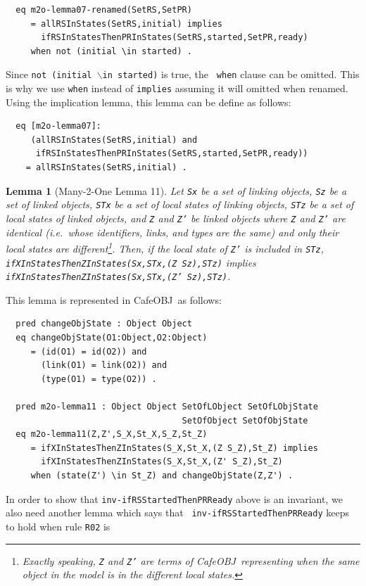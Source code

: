 \documentclass[12pt]{report}
\newtheorem{lemma}{Lemma}
\newcommand{\stt}[1]{{\small{\tt {#1}}}}
\newcommand{\cafeobj}{{\sf CafeOBJ}~}
\begin{document}
\begin{verbatim}
  eq m2o-lemma07-renamed(SetRS,SetPR)
     = allRSInStates(SetRS,initial) implies 
       ifRSInStatesThenPRInStates(SetRS,started,SetPR,ready)
     when not (initial \in started) .
\end{verbatim}
Since \stt{not (initial $\backslash$in started)} is true, the {\tt
  when} clause can be omitted. This is why we use {\tt when} instead
of {\tt implies} assuming it will omitted when renamed. Using the
implication lemma, this lemma can be define as follows:
\begin{verbatim}
  eq [m2o-lemma07]:
     (allRSInStates(SetRS,initial) and
      ifRSInStatesThenPRInStates(SetRS,started,SetPR,ready))
    = allRSInStates(SetRS,initial) .
\end{verbatim}

\begin{lemma}[Many-2-One Lemma 11]
  Let {\tt Sx} be a set of linking objects, {\tt Sz} be a set of
  linked objects, {\tt STx} be a set of local states of linking
  objects, {\tt STz} be a set of local states of linked objects, and
  {\tt Z} and {\tt Z'} be linked objects where {\tt Z} and {\tt Z'}
  are identical (i.e.\ whose identifiers, links, and types are the
  same) and only their local states are different\footnote{Exactly
    speaking, {\tt Z} and {\tt Z'} are terms of \cafeobj representing
    when the same object in the model is in the different local
    states.}.  Then, if the local state of {\tt Z'} is included in
  {\tt STz}, \stt{ifXInStatesThenZInStates(Sx,STx,(Z Sz),STz)}
  implies\\ \stt{ifXInStatesThenZInStates(Sx,STx,(Z' Sz),STz)}.
\end{lemma}
This lemma is represented in \cafeobj as follows:
\begin{verbatim}
  pred changeObjState : Object Object
  eq changeObjState(O1:Object,O2:Object)
     = (id(O1) = id(O2)) and 
       (link(O1) = link(O2)) and
       (type(O1) = type(O2)) .

  pred m2o-lemma11 : Object Object SetOfLObject SetOfLObjState
                                   SetOfObject SetOfObjState
  eq m2o-lemma11(Z,Z',S_X,St_X,S_Z,St_Z)
     = ifXInStatesThenZInStates(S_X,St_X,(Z S_Z),St_Z) implies
       ifXInStatesThenZInStates(S_X,St_X,(Z' S_Z),St_Z) 
     when (state(Z') \in St_Z) and changeObjState(Z,Z') .
\end{verbatim}
In order to show that {\tt inv-ifRSStartedThenPRReady} above is an
invariant, we also need another lemma which says that {\tt
  inv-ifRSStartedThenPRReady} keeps to hold when rule {\tt R02} is
\end{document}
